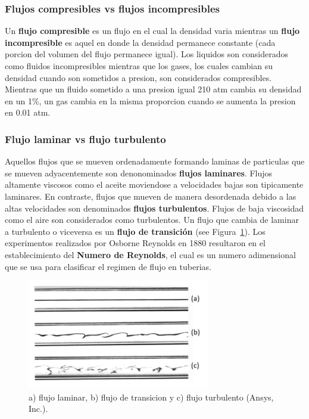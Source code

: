 \documentclass[10pt, oneside]{article}
\begin{document}
\subsubsection{Flujos compresibles vs flujos incompresibles} 
Un \textbf{flujo compresible} es un flujo en el cual la densidad varia mientras un \textbf{flujo incompresible} es aquel en donde la densidad permanece constante (cada porcion del volumen del flujo permanece igual). Los liquidos son considerados como fluidos incompresibles mientras que los gases, los cuales cambian su densidad cuando son sometidos a presion, son considerados compresibles. Mientras que un fluido sometido a una presion igual 210 atm cambia su densidad en un 1\%, un gas cambia en la misma proporcion cuando se aumenta la presion en 0.01 atm. 


\subsubsection{Flujo laminar vs flujo turbulento}
Aquellos flujos que se mueven ordenadamente formando laminas de particulas que se mueven adyacentemente son denonominados \textbf{flujos laminares}. Flujos altamente viscosos como el aceite moviendose a velocidades bajas son tipicamente laminares. En contraste, flujos que mueven de manera desordenada debido a las altas velocidades son denominados \textbf{flujos turbulentos}. Flujos de baja viscosidad como el aire son considerados como turbulentos. Un flujo que cambia de laminar a turbulento o viceversa es un \textbf{flujo de transici\'on} (see Figura~\ref{fLamTur}). Los experimentos realizados por Osborne Reynolds en 1880 resultaron en el establecimiento del \textbf{Numero de Reynolds}, el cual es un numero adimensional que se usa para clasificar el regimen de flujo en tuberias.  

\begin{figure}[h]
\centering
\includegraphics[width=8cm]{fLamTur}
\caption{a) flujo laminar, b) flujo de transicion y c) flujo turbulento (Ansys, Inc.).}
\label{fLamTur}
\end{figure}
\end{document}
